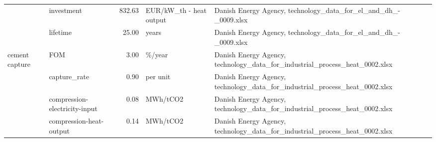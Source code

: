 \begin{longtable}{p{5cm}p{3cm}rp{3cm}p{11cm}}
                      & investment &         832.63 &           EUR/kW\_th - heat output &                                                                                                                                                                                                                                                                      Danish Energy Agency, technology\_data\_for\_el\_and\_dh\_-\_0009.xlsx \\
                      & lifetime &          25.00 &                             years &                                                                                                                                                                                                                                                                      Danish Energy Agency, technology\_data\_for\_el\_and\_dh\_-\_0009.xlsx \\
cement capture & FOM &           3.00 &                            \%/year &                                                                                                                                                                                                                                                          Danish Energy Agency, technology\_data\_for\_industrial\_process\_heat\_0002.xlsx \\
                      & capture\_rate &           0.90 &                          per unit &                                                                                                                                                                                                                                                          Danish Energy Agency, technology\_data\_for\_industrial\_process\_heat\_0002.xlsx \\
                      & compression-electricity-input &           0.08 &                          MWh/tCO2 &                                                                                                                                                                                                                                                          Danish Energy Agency, technology\_data\_for\_industrial\_process\_heat\_0002.xlsx \\
                      & compression-heat-output &           0.14 &                          MWh/tCO2 &                                                                                                                                                                                                                                                          Danish Energy Agency, technology\_data\_for\_industrial\_process\_heat\_0002.xlsx \\

\end{longtable}
